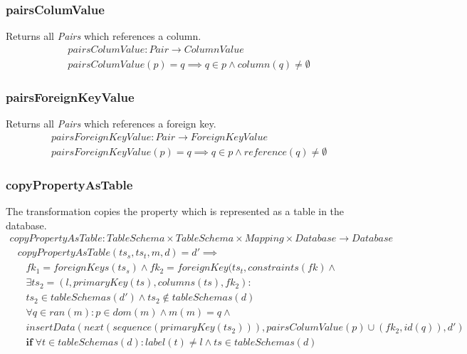 \documentclass[10pt]{article}
\begin{document}
\subsubsection{pairsColumValue}
Returns all \emph{Pairs} which references a column.
\begin{align}
& pairsColumValue: Pair \rightarrow ColumnValue \\
& pairsColumValue(p) = q \implies q \in p \land column(q) \neq \emptyset  
\end{align}

\subsubsection{pairsForeignKeyValue}
Returns all \emph{Pairs} which references a foreign key.
\begin{align}
& pairsForeignKeyValue : Pair \rightarrow ForeignKeyValue \\
& pairsForeignKeyValue(p) = q \implies q \in p \land reference(q) \neq \emptyset 
\end{align}


\subsubsection{copyPropertyAsTable}
The transformation copies the property which is represented as a table in the database.
\begin{align}
copyPropertyAsTable: TableSchema \times TableSchema \times Mapping \times Database \rightarrow Database
\end{align}
\begin{align}
& copyPropertyAsTable(ts_s, ts_t, m, d) = d' \implies \nonumber  \\
& \;\;\; fk_1 = foreignKeys(ts_s) \land fk_2 = foreignKey(ts_t, constraints(fk) \land \nonumber   \\
& \;\;\;  \exists ts_2 = (l, primaryKey(ts), columns(ts), fk_2) :  \nonumber \\
& \;\;\;  ts_2 \in tableSchemas(d') \land ts_2 \notin tableSchemas(d) \nonumber \\
& \;\;\; \forall q \in ran(m) : p \in dom(m) \land m(m) = q \land \nonumber \\  
& \;\;\; insertData(next(sequence(primaryKey(ts_2))), pairsColumValue(p) \cup (fk_2, id(q)) , d')  \nonumber \\
& \;\;\; \mathbf{if} \; \forall t \in tableSchemas(d) : label(t) \neq l \land ts \in tableSchemas(d)
\end{align}
\end{document}
